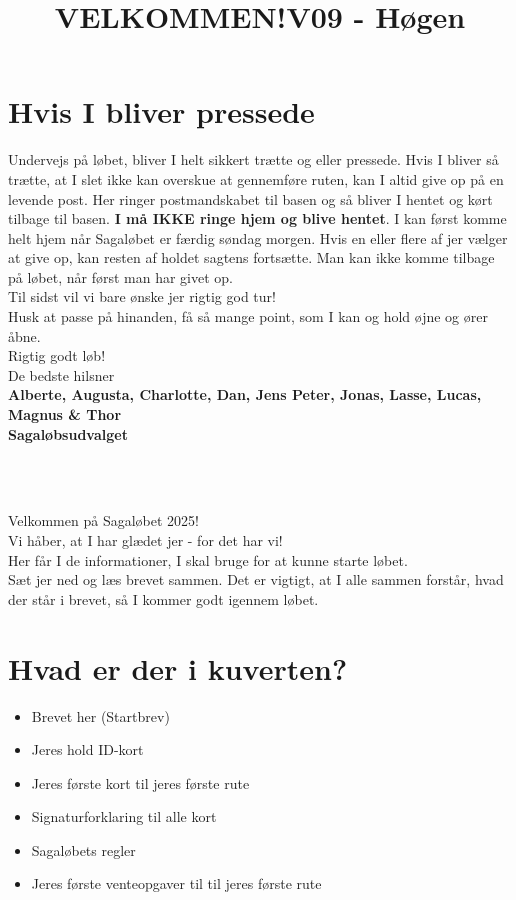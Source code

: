 \section{Hvis I bliver pressede}
Undervejs på løbet, bliver I helt sikkert trætte og eller pressede. Hvis I bliver så trætte, at I slet ikke kan overskue at gennemføre ruten, kan I altid give op på en levende post. Her ringer postmandskabet til basen og så bliver I hentet og kørt tilbage til basen. \textbf{I må IKKE ringe hjem og blive hentet}. I kan først komme helt hjem når Sagaløbet er færdig søndag morgen. Hvis en eller flere af jer vælger at give op, kan resten af holdet sagtens fortsætte. Man kan ikke komme tilbage på løbet, når først man har givet op.\\
\newline
Til sidst vil vi bare ønske jer rigtig god tur!\\
Husk at passe på hinanden, få så mange point, som I kan og hold øjne og ører åbne.\\
\newline
Rigtig godt løb!\\
\newline
\textcolor{søblå}{De bedste hilsner}\\
\textcolor{natblå}{\textbf{Alberte, Augusta, Charlotte, Dan, Jens Peter, Jonas, Lasse, Lucas, Magnus \& Thor}}\\
\textcolor{natblå}{\textbf{Sagaløbsudvalget}}\\
\newpage
\title{VELKOMMEN!}\\
\newline
\title{\textcolor{søblå}{V09 - Høgen }}\\
\newline
Velkommen på Sagaløbet 2025!\\
Vi håber, at I har glædet jer - for det har vi!\\
Her får I de informationer, I skal bruge for at kunne starte løbet.\\
Sæt jer ned og læs brevet sammen. Det er vigtigt, at I alle sammen forstår, hvad der står i brevet, så I kommer godt igennem løbet.
\section{Hvad er der i kuverten?}
\begin{itemize}
    \item Brevet her (Startbrev)
    \item Jeres hold ID-kort
    \item Jeres første kort til jeres første rute
    \item Signaturforklaring til alle kort
    \item Sagaløbets regler
    \item Jeres første venteopgaver til til jeres første rute
\end{itemize}
